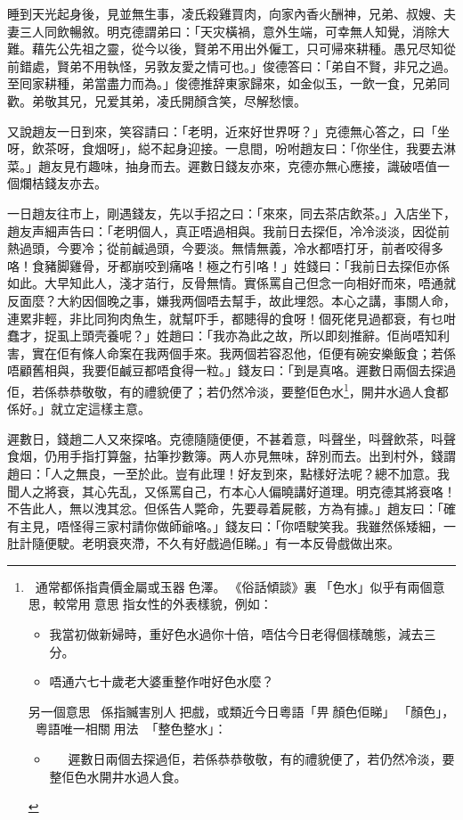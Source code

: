 \documentclass[a5paper, 12pt, openany]{book} %
\begin{document}
	睡到天光起身後，見並無生事，凌氏殺雞買肉，向家內香火酬神，兄弟、叔嫂、夫妻三人同飲暢敘。明克德謂弟曰：「天灾橫禍，意外生端，可幸無人知覺，消除大難。藉先公先祖之靈，從今以後，賢弟不用出外僱工，只可帰來耕種。愚兄尽知從前錯處，賢弟不用執怪，另敦友愛之情可也。」俊德答曰：「弟自不賢，非兄之過。至囘家耕種，弟當盡力而為。」俊德推辞東家歸來，如金似玉，一飲一食，兄弟同歡。弟敬其兄，兄爱其弟，凌氏開顏含笑，尽解愁懷。

	又說趙友一日到來，笑容請曰：「老明，近來好世界呀？」克德無心答之，曰「坐呀，飲茶呀，食烟呀」，縂不起身迎接。一息間，吩咐趙友曰：「你坐住，我要去淋菜。」趙友見冇趣味，抽身而去。遲數日錢友亦來，克德亦無心應接，識破唔值一個爛桔錢友亦去。

	一日趙友往市上，剛遇錢友，先以手招之曰：「來來，同去茶店飲茶。」入店坐下，趙友声細声告曰：「老明個人，真正唔過相與。我前日去探佢，冷冷淡淡，因從前熱過頭，今要冷；從前鹹過頭，今要淡。無情無義，冷水都唔打牙，前者咬得多咯！食豬脚雞骨，牙都崩咬到痛咯！極之冇引咯！」姓錢曰：「我前日去探佢亦係如此。大早知此人，淺才萡行，反骨無情。實係罵自己但念一向相好而來，唔通就反面麼？大約因個晚之事，嫌我两個唔去幫手，故此埋怨。本心之講，事關人命，連累非輕，非比同狗肉魚生，就幫吓手，都贃得的食呀！個死佬見過都衰，有乜咁蠢才，捉虱上頭壳養呢？」姓趙曰：「我亦為此之故，所以即刻推辭。佢尚唔知利害，實在佢有條人命案在我两個手來。我两個若容忍他，佢便有碗安樂飯食；若係唔顧舊相與，我要佢鹹豆都唔食得一粒。」錢友曰：「到是真咯。遲數日兩個去探過佢，若係恭恭敬敬，有的禮貌便了；若仍然冷淡，要整佢色水\footnote{󱛖󱀱通常都係指貴價金屬或玉器󱝚色澤。󱪙《俗話傾談》裏󰊺「色水」似乎有兩個意思，較常用󱝚意思󱪙指女性的外表樣貌，例如：
  \begin{itemize}[itemsep=0pt, parsep=0pt]
  \item 我當初做新婦時，重好色水過你十倍，唔估今日老得個樣醜態，減去三分。
  \item 唔通六七十歲老大婆重整作咁好色水麼？
  \end{itemize}
  另一個意思󰳞，係指贓害別人󱝚把戲，或類近今日粵語「畀顏色佢睇」󱝚「顏色」，󱛖󱩑粵語唯一相關󱝚用法「整色整水」：
  \begin{itemize}[itemsep=0pt, parsep=0pt]
  \item   遲數日兩個去探過佢，若係恭恭敬敬，有的禮貌便了，若仍然冷淡，要整佢色水開井水過人食。
  \end{itemize}
  }，開井水過人食都係好。」就立定這樣主意。

	遲數日，錢趙二人又來探咯。克德隨隨便便，不甚着意，呌聲坐，呌聲飲茶，呌聲食烟，仍用手指打算盤，拈筆抄數簿。两人亦見無味，辞別而去。出到村外，錢謂趙曰：「人之無良，一至於此。豈有此理！好友到來，點樣好法呢？總不加意。我聞人之將衰，其心先乱，又係罵自己，冇本心人偏曉講好道理。明克德其將衰咯！不告此人，無以洩其忿。但係告人斃命，先要尋着屍骸，方為有據。」趙友曰：「確有主見，唔怪得三家村請你做師爺咯。」錢友曰：「你唔駛笑我。我雖然係矮細，一肚計隨便駛。老明衰夾滯，不久有好戲過佢睇。」有一本反骨戲做出來。
\end{document}
